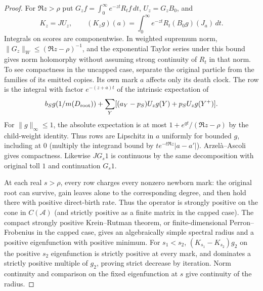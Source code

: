 \documentclass[11pt]{article}
\theoremstyle{remark}
\numberwithin{equation}{section}
\begin{document}
\begin{proof}
For $\Re z>\rho$ put $G_z f=\int_0^\infty e^{-zt}R_tf\,dt$, $U_z=G_z B_0$, and
\begin{equation}\label{eq:core-kernel}
 K_z=JU_z,\qquad (K_zg)(a)=\int_0^\infty e^{-zt}R_t(B_0g)(J_a)\,dt.
\end{equation}
Integrals on scores are componentwise. In weighted supremum norm, $\|G_z\|_W\le(\Re z-\rho)^{-1}$, and the exponential Taylor series under this bound gives norm holomorphy without assuming strong continuity of $R_t$ in that norm. To see compactness in the uncapped case, separate the original particle from the families of its emitted copies. Its own mark $a$ affects only its death clock. The row is the integral with factor $e^{-(z+a)t}$ of the intrinsic expectation of
\[
 b_Sg(1/m(D_{\rm root})) +\sum_Y[(a_Y-p_S)U_zg(Y)+p_SU_zg(Y^+)].
\]
For $\|g\|_\infty\le1$, the absolute expectation is at most $1+e^{qt}/(\Re z-\rho)$ by the child-weight identity. Thus rows are Lipschitz in $a$ uniformly for bounded $g$, including at $0$ (multiply the integrand bound by $te^{-t\Re z}|a-a'|$). Arzel\`a--Ascoli gives compactness. Likewise $JG_s1$ is continuous by the same decomposition with original toll $1$ and continuation $G_s1$.

At each real $s>\rho$, every row charges every nonzero newborn mark: the original root can survive, gain leaves alone to the corresponding degree, and then hold there with positive direct-birth rate. Thus the operator is strongly positive on the cone in $C(\mathcal A)$ (and strictly positive as a finite matrix in the capped case). The compact strongly positive Krein--Rutman theorem, or finite-dimensional Perron--Frobenius in the capped case, gives an algebraically simple spectral radius and a positive eigenfunction with positive minimum. For $s_1<s_2$, $(K_{s_1}-K_{s_2})g_2$ on the positive $s_2$ eigenfunction is strictly positive at every mark, and dominates a strictly positive multiple of $g_2$, proving strict decrease by iteration. Norm continuity and comparison on the fixed eigenfunction at $s$ give continuity of the radius.


\end{proof}
\end{document}
